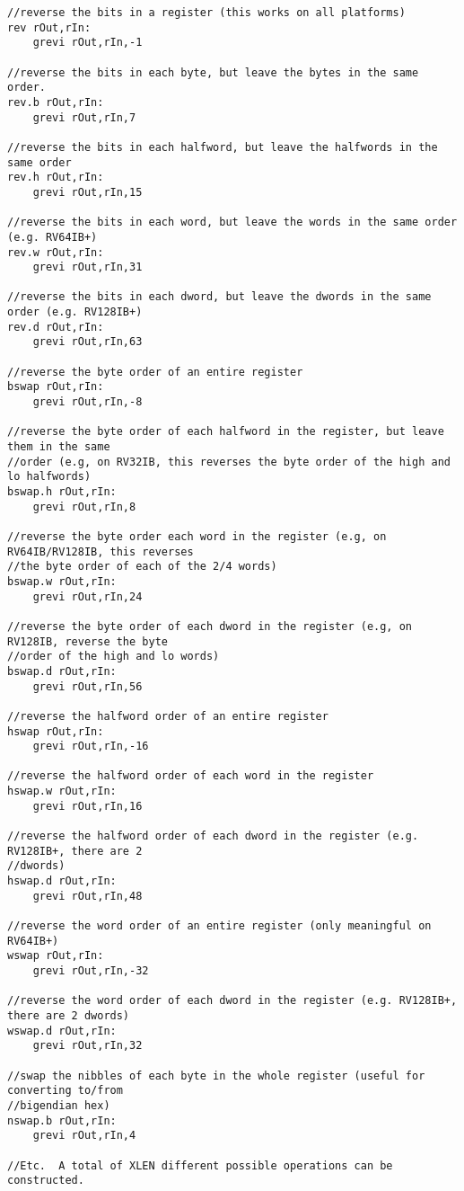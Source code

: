 \begin{verbatim}
//reverse the bits in a register (this works on all platforms)
rev rOut,rIn:
    grevi rOut,rIn,-1

//reverse the bits in each byte, but leave the bytes in the same order.
rev.b rOut,rIn:
    grevi rOut,rIn,7

//reverse the bits in each halfword, but leave the halfwords in the same order
rev.h rOut,rIn:
    grevi rOut,rIn,15

//reverse the bits in each word, but leave the words in the same order (e.g. RV64IB+)
rev.w rOut,rIn:
    grevi rOut,rIn,31

//reverse the bits in each dword, but leave the dwords in the same order (e.g. RV128IB+)
rev.d rOut,rIn:
    grevi rOut,rIn,63

//reverse the byte order of an entire register
bswap rOut,rIn:
    grevi rOut,rIn,-8

//reverse the byte order of each halfword in the register, but leave them in the same
//order (e.g, on RV32IB, this reverses the byte order of the high and lo halfwords)
bswap.h rOut,rIn:
    grevi rOut,rIn,8

//reverse the byte order each word in the register (e.g, on RV64IB/RV128IB, this reverses
//the byte order of each of the 2/4 words)
bswap.w rOut,rIn:
    grevi rOut,rIn,24

//reverse the byte order of each dword in the register (e.g, on RV128IB, reverse the byte
//order of the high and lo words)
bswap.d rOut,rIn:
    grevi rOut,rIn,56

//reverse the halfword order of an entire register
hswap rOut,rIn:
    grevi rOut,rIn,-16

//reverse the halfword order of each word in the register
hswap.w rOut,rIn:
    grevi rOut,rIn,16

//reverse the halfword order of each dword in the register (e.g. RV128IB+, there are 2
//dwords)
hswap.d rOut,rIn:
    grevi rOut,rIn,48

//reverse the word order of an entire register (only meaningful on RV64IB+)
wswap rOut,rIn:
    grevi rOut,rIn,-32

//reverse the word order of each dword in the register (e.g. RV128IB+, there are 2 dwords)
wswap.d rOut,rIn:
    grevi rOut,rIn,32

//swap the nibbles of each byte in the whole register (useful for converting to/from
//bigendian hex)
nswap.b rOut,rIn:
    grevi rOut,rIn,4

//Etc.  A total of XLEN different possible operations can be constructed.
\end{verbatim}

